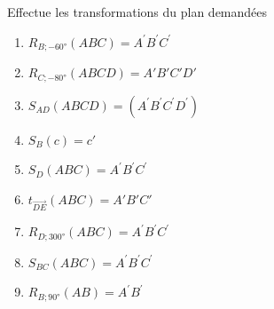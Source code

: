\newpage

\begin{exercise}
  Effectue les transformations du plan demandées
  \begin{enumerate}
    \item $R_{B; \ang{-60}}\left( ABC \right) = A^{'}B^{'}C^{'}$
          \begin{center}
            
          \end{center}
    \item $R_{C; \ang{-80}}\left( ABCD \right) = A'B'C'D'$
          \begin{center}
            
          \end{center}
    \item $S_{AD}(ABCD) = (A^{'}B^{'}C^{'}D^{'})$
          \begin{center}
            
          \end{center}
          \newpage
    \item $S_{B}(c) = c'$
          \begin{center}
            
          \end{center}
    \item $S_{D}\left( ABC \right) = A^{'}B^{'}C^{'}$
          \begin{center}
            
          \end{center}
    \item $t_{\overrightarrow{DE}}\left( ABC \right) = A'B'C'$
          \begin{center}
            
          \end{center}
          \newpage
    \item $R_{D;\ang{300}}\left( ABC \right) = A^{'}B^{'}C^{'}$
          \begin{center}
            
          \end{center}
    \item $S_{BC}\left( ABC \right) = A^{'}B^{'}C^{'}$
          \begin{center}
            
          \end{center}
    \item $R_{B;\ang{90}}\left( AB \right) = A^{'}B^{'}$
          \begin{center}
            
          \end{center}

\end{enumerate}
\end{exercise}
